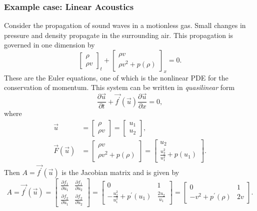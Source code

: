 \subsubsection{Example case: Linear Acoustics}
Consider the propagation of sound waves in a motionless gas. Small changes in pressure and density propagate in the surrounding air. This propagation is governed in one dimension by
\begin{equation}
	\begin{bmatrix}
		\rho \\ \rho v 
	\end{bmatrix}_t
	+
	\begin{bmatrix}
		\rho v \\ \rho v^2 + p(\rho)
	\end{bmatrix}_x
	= 0.
	\label{eq:massmomentum_acoustics}
\end{equation}
These are the Euler equations, one of which is the nonlinear PDE for the conservation of momentum. This system can be written in \textit{quasilinear} form~\cite{toroRiemannSolversEvolved2006}
\begin{equation}
	\frac{\partial \vec u}{\partial t} + \vec {f^\prime}(\vec u) \frac{\partial \vec u}{\partial x} = 0,
\end{equation}
where
\begin{align}
	\vec u &= 
	\begin{bmatrix}
		\rho \\ \rho v
	\end{bmatrix}
	=
	\begin{bmatrix}
		u_1 \\ u_2
	\end{bmatrix},
	\\
	\vec F(\vec u) &= 
	\begin{bmatrix}
		\rho v \\ \rho v^2 + p(\rho)
	\end{bmatrix}
	=
	\begin{bmatrix}
		u_2 \\ \frac{u_2^2}{u_1^2} + p(u_1)
	\end{bmatrix}.
\end{align}
Then $A = \vec {f^\prime} (\vec u)$ is the Jacobian matrix and is given by
\begin{equation}
	A = \vec {f^\prime} (\vec u) =
	\begin{bmatrix}
		\frac{\partial f_1}{\partial u_1} & \frac{\partial f_1}{\partial u_2} \\ 
		\frac{\partial f_2}{\partial u_1} & \frac{\partial f_2}{\partial u_2} 
	\end{bmatrix}
	= 
	\begin{bmatrix}
		0 & 1 \\
		-\frac{u_2^2}{u_1^2} + p^\prime(u_1) & \frac{2 u_2}{u_1}
	\end{bmatrix}
	=
	\begin{bmatrix}
		0 & 1 \\
		-v^2 + p^\prime(\rho) & 2 v
	\end{bmatrix}.
\end{equation}
